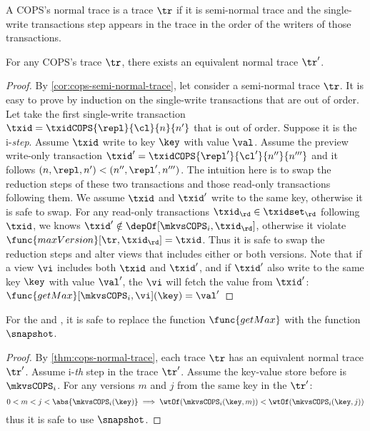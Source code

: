 A COPS's normal trace is a trace \( \tr \) if it is semi-normal trace and the single-write transactions step appears in the trace in the order of the writers of those transactions.

\begin{theorem}
    \label{thm:cops-normal-trace}
    \label{lem:cops-normal-trace}
    \label{cor:cops-normal-trace}
    For any COPS's trace \( \tr \), there exists an equivalent normal trace \( \tr' \).
\end{theorem}
\begin{proof}
    By \cref{cor:cops-semi-normal-trace}, let consider a semi-normal trace \( \tr \).
    It is easy to prove by induction on the single-write transactions that are out of order.
    Let take the first single-write transaction \( \txid = \txidCOPS{\repl}{\cl}{n}{n'} \) that is out of order.
    Suppose it is the i-\emph{step}.
    Assume \( \txid \) write to key \( \key \) with value \( \val \).
    Assume the preview write-only transaction \( \txid'  = \txidCOPS{\repl'}{\cl'}{n''}{n'''} \) and it follows \( (n,\repl,n') < (n'', \repl', n''') \).
    The intuition here is to swap the reduction steps of these two transactions and those read-only transactions following them.
    We assume \( \txid \)  and \( \txid' \) write to the same key, otherwise it is safe to swap.
    For any read-only transactions \( \txid_{\rd} \in \txidset_{\rd} \) following \( \txid \), we knows \( \txid' \notin \depOf[\mkvsCOPS_i, \txid_{\rd}] \), otherwise it violate \( \func{maxVersion}[\tr, \txid_\rd] = \txid \).
    Thus it is safe to swap the reduction steps and alter views that includes either or both versions.
    Note that if a view \( \vi \) includes both \( \txid \)  and \( \txid' \), and if \( \txid' \) also write to the same key \( \key \) with value \( \val' \), the \( \vi \) will fetch the value from \( \txid' \):
    \( \func{getMax}[\mkvsCOPS_i,\vi](\key) = \val' \)
\end{proof}

\begin{corollary}
    \label{cor:get-max-to-get-snap}
    For the  and , it is safe to replace the function \( \func{getMax} \) with the function \( \snapshot \).
\end{corollary}
\begin{proof}
    By \cref{thm:cops-normal-trace}, each trace \( \tr \) has an equivalent normal trace \( \tr' \).
    Assume i-\emph{th} step in the trace \( \tr' \).
    Assume the key-value store before is \( \mkvsCOPS_i \).
    For any versions \( m \) and \( j \) from the same key in the \( \tr' \):
    \[
        0 < m < j < \abs{\mkvsCOPS_i(\key)} \implies \wtOf(\mkvsCOPS_i(\key,m)) <  \wtOf(\mkvsCOPS_i(\key,j))
    \]
    thus it is safe to use \( \snapshot \).
\end{proof}

